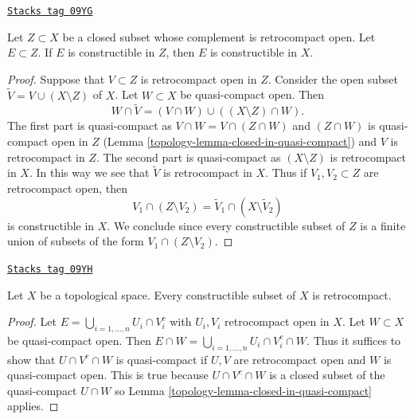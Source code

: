 \begin{lemma}
\label{topology-lemma-closed-constructible-image}
\href{https://stacks.math.columbia.edu/tag/09YG}{\texttt{Stacks tag 09YG}}

Let $Z \subset X$ be a closed subset whose complement is retrocompact open.
Let $E \subset Z$. If $E$ is constructible in $Z$, then $E$ is constructible
in $X$.
\end{lemma}

\begin{proof}

Suppose that $V \subset Z$ is retrocompact open in $Z$. Consider the open
subset $\tilde V = V \cup (X \setminus Z)$ of $X$. Let $W \subset X$ be
quasi-compact open. Then
$$
W \cap \tilde V =
\left(V \cap W\right) \cup \left((X \setminus Z) \cap W\right).
$$
The first part is quasi-compact as $V \cap W = V \cap (Z \cap W)$ and
$(Z \cap W)$ is quasi-compact open in $Z$
(Lemma \ref{topology-lemma-closed-in-quasi-compact}) and $V$ is retrocompact in $Z$.
The second part is quasi-compact as $(X \setminus Z)$ is retrocompact in $X$.
In this way we see that $\tilde V$ is retrocompact in $X$.
Thus if $V_1, V_2 \subset Z$ are retrocompact open, then
$$
V_1 \cap (Z \setminus V_2) = \tilde V_1 \cap (X \setminus \tilde V_2)
$$
is constructible in $X$. We conclude since every constructible subset of $Z$
is a finite union of subsets of the form $V_1 \cap (Z \setminus V_2)$.
\end{proof}

\begin{lemma}
\label{topology-lemma-constructible-is-retrocompact}
\href{https://stacks.math.columbia.edu/tag/09YH}{\texttt{Stacks tag 09YH}}

Let $X$ be a topological space. Every constructible
subset of $X$ is retrocompact.
\end{lemma}

\begin{proof}

Let $E = \bigcup_{i = 1, \ldots, n} U_i \cap V_i^c$ with $U_i, V_i$
retrocompact open in $X$. Let $W \subset X$ be quasi-compact open.
Then $E \cap W = \bigcup_{i = 1, \ldots, n} U_i \cap V_i^c \cap W$.
Thus it suffices to show that $U \cap V^c \cap W$ is quasi-compact
if $U, V$ are retrocompact open and $W$ is quasi-compact
open. This is true because $U \cap V^c \cap W$ is a closed
subset of the quasi-compact $U \cap W$ so
Lemma \ref{topology-lemma-closed-in-quasi-compact}
applies.
\end{proof}

